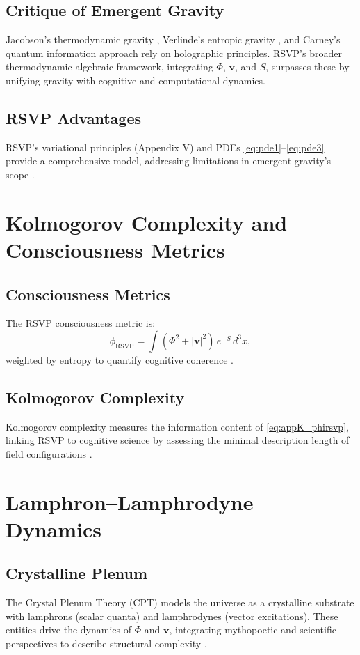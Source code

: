 \documentclass[12pt]{report}
\newcommand{\PhiRSVP}{\Phi}
\newcommand{\vRSVP}{\mathbf{v}}
\newcommand{\SRSVP}{S}
\newcommand{\phirsvp}{\phi_{\text{RSVP}}}
\begin{document}
\section{Critique of Emergent Gravity}
Jacobson’s thermodynamic gravity \citep{Jacobson1995}, Verlinde’s entropic gravity \citep{Verlinde2011}, and Carney’s quantum information approach \citep{Carney2019} rely on holographic principles. RSVP’s broader thermodynamic-algebraic framework, integrating \(\PhiRSVP\), \(\vRSVP\), and \(\SRSVP\), surpasses these by unifying gravity with cognitive and computational dynamics.

\section{RSVP Advantages}
RSVP’s variational principles (Appendix V) and PDEs \eqref{eq:pde1}--\eqref{eq:pde3} provide a comprehensive model, addressing limitations in emergent gravity’s scope \citep{RSVPMeta2025}.

\chapter{Kolmogorov Complexity and Consciousness Metrics}
\label{app:K}
\section{Consciousness Metrics}
The RSVP consciousness metric is:
\begin{equation}
\phirsvp = \int (\PhiRSVP^2 + |\vRSVP|^2) \, e^{-\SRSVP} \, d^3x, \label{eq:appK_phirsvp}
\end{equation}
weighted by entropy to quantify cognitive coherence \citep{RSVPMeta2025}.

\section{Kolmogorov Complexity}
Kolmogorov complexity measures the information content of \eqref{eq:appK_phirsvp}, linking RSVP to cognitive science by assessing the minimal description length of field configurations \citep{Kolmogorov1965}.

\chapter{Lamphron–Lamphrodyne Dynamics}
\label{app:L}
\section{Crystalline Plenum}
The Crystal Plenum Theory (CPT) models the universe as a crystalline substrate with lamphrons (scalar quanta) and lamphrodynes (vector excitations). These entities drive the dynamics of \(\PhiRSVP\) and \(\vRSVP\), integrating mythopoetic and scientific perspectives to describe structural complexity \citep{Flyxion2025}.
\end{document}
